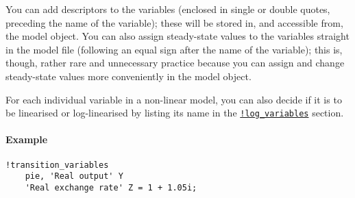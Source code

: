 You can add descriptors to the variables (enclosed in single or double
quotes, preceding the name of the variable); these will be stored in,
and accessible from, the model object. You can also assign steady-state
values to the variables straight in the model file (following an equal
sign after the name of the variable); this is, though, rather rare and
unnecessary practice because you can assign and change steady-state
values more conveniently in the model object.

For each individual variable in a non-linear model, you can also decide
if it is to be linearised or log-linearised by listing its name in the
\href{modellang/logvariables}{\texttt{!log\_variables}} section.

\paragraph{Example}

\begin{verbatim}
!transition_variables
    pie, 'Real output' Y
    'Real exchange rate' Z = 1 + 1.05i;
\end{verbatim}


